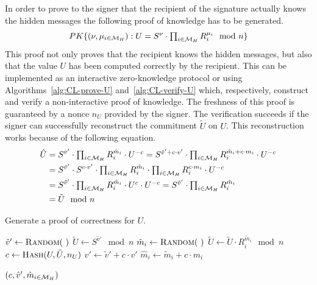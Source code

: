 In order to prove to the signer that the recipient of the signature actually
knows the hidden messages the following proof of knowledge has to be generated.
\begin{equation*}
  PK\{(\nu, \mu_{i \in \mathcal{M}_H}) :
    U = S^{\nu} \cdot \textstyle\prod_{i \in \mathcal{M}_H} R_i^{\mu_i} \mod n\}
\end{equation*}
This proof not only proves that the recipient knows the hidden messages, but
also that the value $U$ has been computed correctly by the recipient. This can
be implemented as an interactive zero-knowledge protocol or using
Algorithms~\ref{alg:CL-prove-U} and~\ref{alg:CL-verify-U} which, respectively,
construct and verify a non-interactive proof of knowledge. The freshness of this
proof is guaranteed by a nonce $n_U$ provided by the signer. The verification
succeeds if the signer can successfully reconstruct the commitment $\tilde{U}$
on $U$. This reconstruction works because of the following equation.
\begin{align*}
  \hat{U}
  & = S^{\hat{v}'} \cdot \textstyle \prod_{i \in \mathcal{M}_H} R_i^{\hat{m}_i}
    \cdot U^{-c}
    = S^{\tilde{v}' + c \cdot v'} \cdot
    \textstyle\prod_{i \in \mathcal{M}_H} R_i^{\tilde{m}_i + c \cdot m_i}
    \cdot U^{-c} \\
  & = S^{\tilde{v}'} \cdot S^{c \cdot v'}
    \cdot \textstyle\prod_{i \in \mathcal{M}_H} R_i^{\tilde{m}_i}
    \cdot \textstyle\prod_{i \in \mathcal{M}_H} R_i^{c \cdot m_i}
    \cdot U^{-c}  \\
  & = S^{\tilde{v}'}
    \cdot \textstyle\prod_{i \in \mathcal{M}_H} R_i^{\tilde{m}_i}
    \cdot U^c \cdot U^{-c}
    = S^{\tilde{v}'} \cdot \textstyle\prod_{i \in \mathcal{M}_H} R_i^{\tilde{m}_i} \\
  & = \tilde{U} \mod n
\end{align*}

\begin{algorithm}
  \caption{Generate a proof of correctness for $U$.}
  \label{alg:CL-prove-U}
  \addtolength{\baselineskip}{1mm}
  \begin{algorithmic}[1]
      \State $\tilde{v}' \gets \Call{Random}{~}$
      \State $\tilde{U} \gets S^{\tilde{v}'} \mod n$
        \State $\tilde{m}_i \gets \Call{Random}{~}$
        \State $\tilde{U} \gets \tilde{U} \cdot R_i^{\tilde{m}_i} \mod n$
      \EndFor
      \State $c \gets \Call{Hash}{U, \tilde{U}, n_U}$
      \State $\hat{v}' \gets \tilde{v}' + c \cdot v'$
        \State $\hat{m}_i \gets \tilde{m}_i + c \cdot m_i$
      \EndFor

      \Return $(c, \hat{v}', \hat{m}_{i \in \mathcal{M}_H})$
    \EndFunction
  \end{algorithmic}
\end{algorithm}

